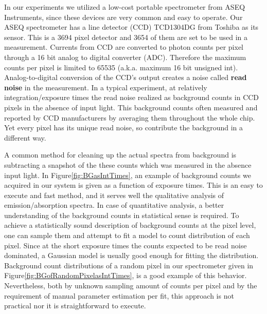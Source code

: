 In our experiments we utilized a low-cost portable spectrometer from ASEQ 
Instruments, since these devices are very common and easy to operate. Our
ASEQ spectrometer has a line detector (CCD) TCD1304DG from Toshiba as its 
sensor. This is a 3694 pixel detector and 3654 of them are set to be used 
in a measurement. Currents from CCD are converted to photon counts per pixel 
through a 16 bit analog to digital converter (ADC). Therefore the maximum 
counts per pixel is limited to 65535 (a.k.a. maximum 16 bit unsigned int). 
Analog-to-digital conversion of the CCD's output creates a noise called 
\textbf{read noise} in the measurement. In a typical experiment, at relatively 
integration/exposure times the read noise realized as background counts in
CCD pixels in the absence of input light. This background counts often 
measured and reported by CCD manufacturers by averaging them throughout
the whole chip. Yet every pixel has its unique read noise, so contribute the
background in a different way.  

A common method for cleaning up the actual spectra from background is 
subtracting a snapshot of the these counts which was measured in the absence 
input light. In Figure\ref{fig:BGasIntTimes}, an example of 
background counts we acquired in our system is given as a function of exposure times. 
This is an easy to execute and fast method, and it serves well the qualitative analysis 
of emission/absorption spectra. In case of quantitative analysis, a better understanding 
of the background counts in statistical sense is required. To achieve a statistically 
sound description of background counts at the pixel level, one can sample them and 
attempt to fit a model to count distribution of each pixel. Since at the short exposure 
times the counts expected to be read noise dominated, a Gaussian model is usually good 
enough for fitting the distribution. Background count distributions of a random pixel
in our spectrometer given in Figure\ref{fig:BGofRandomPixelasIntTimes}, is a good
example of this behavior. Nevertheless, both by unknown sampling amount
of counts per pixel and by the requirement of manual parameter estimation per
fit, this approach is not practical nor it is straightforward to execute.

